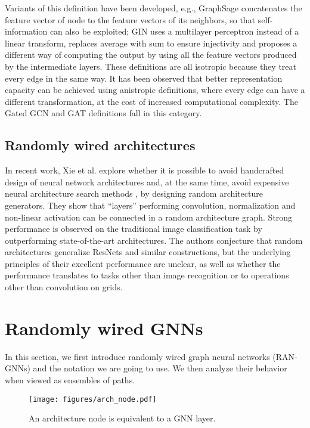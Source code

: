 \documentclass[10pt,twocolumn,twoside]{IEEEtran}
\begin{document}
Variants of this definition have been developed, e.g., GraphSage \cite{hamilton2017inductive} concatenates the feature vector of node  to the feature vectors of its neighbors, so that self-information can also be exploited; GIN \cite{xu2018powerful} uses a multilayer perceptron instead of a linear transform, replaces average with sum to ensure injectivity and proposes a different way of computing the output by using all the feature vectors produced by the intermediate layers. These definitions are all isotropic because they treat every edge in the same way. It has been observed that better representation capacity can be achieved using anistropic definitions, where every edge can have a different transformation, at the cost of increased computational complexity. The Gated GCN \cite{bresson2017residual} and GAT \cite{velivckovic2017graph} definitions fall in this category.


\subsection{Randomly wired architectures}

In recent work, Xie et al. \cite{xie2019exploring} explore whether it is possible to avoid handcrafted design of neural network architectures and, at the same time, avoid expensive neural architecture search methods \cite{elsken2019neural}, by designing random architecture generators. They show that ``layers'' performing convolution, normalization and non-linear activation can be connected in a random architecture graph. Strong performance is observed on the traditional image classification task by outperforming state-of-the-art architectures. The authors conjecture that random architectures generalize ResNets and similar constructions, but the underlying principles of their excellent performance are unclear, as well as whether the performance translates to tasks other than image recognition or to operations other than convolution on grids.


\section{Randomly wired GNNs}



In this section, we first introduce randomly wired graph neural networks (RAN-GNNs) and the notation we are going to use. We then analyze their behavior when viewed as ensembles of paths.

\begin{figure}
  \centering
  \texttt{[image: figures/arch\_node.pdf]}
    \caption{An architecture node is equivalent to a GNN layer.}
  \label{fig:architecture_node}
\end{figure}
\end{document}
